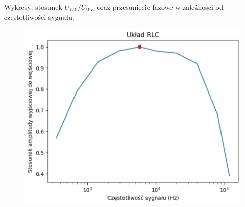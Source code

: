 \documentclass[14pt, table]{extarticle}
\begin{document}
\begin{figure}[H]
    \centering
    \qquad
\end{figure}

\newpage
Wykresy: stosunek $U_{WY} / U_{WE}$ oraz przesunięcie fazowe w zależności od częstotliwości sygnału.

\begin{figure}[H]
\includegraphics[scale=0.7]{D4}
\centering
\captionsetup{labelformat=empty}
\caption{}
\end{figure}
\end{document}
